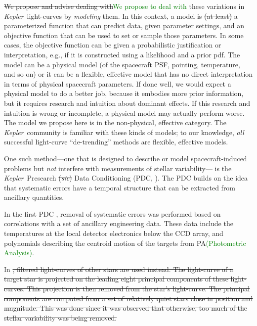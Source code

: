 \documentclass[12pt, preprint]{aastex}
\newcommand{\notenglish}[1]{\textit{#1}}
\newcommand{\sic}{\notenglish{sic}}
\newcommand{\project}[1]{\textsl{#1}}
\newcommand{\Kepler}{\project{Kepler}}
\newcommand{\revise}[1]{\textcolor{green}{#1}}
\newcommand{\remove}[1]{\sout{#1}}
\begin{document}
\remove{We propose and advise dealing with}\revise{We propose to deal with} these variations in \Kepler\ light-curves by \emph{modeling} them.
In this context, a model is \remove{(at least)} a parameterized function that can predict data, given parameter settings,
  and an objective function that can be used to set or sample those parameters.
In some cases, the objective function can be given a probabilistic justification or interpretation, e.g., if it is constructed using a likelihood and a prior pdf.
The model can be a physical model (of the spacecraft PSF, pointing, temperature, and so on)
  or it can be a flexible, effective model that has no direct interpretation in terms of physical spacecraft parameters.
If done well, we would expect a physical model to do a better job,
  because it embodies more prior information,
  but it requires research and intuition about dominant effects. 
If this research and intuition is wrong or incomplete, a physical model may actually perform worse.
The model we propose here is in the non-physical, effective category.
The \Kepler\ community is familiar with these kinds of models;
  to our knowledge, \emph{all} successful light-curve ``de-trending'' methods
  are flexible, effective models.

One such method---one that is designed to describe or model spacecraft-induced problems
  but \emph{not} interfere with measurements of stellar variability---%
  is the \Kepler\ Presearch \remove{(\sic)} Data Conditioning (PDC, \cite{pdc1}).
The PDC builds on the idea that systematic errors have a temporal structure that can be extracted from ancillary quantities. 
%

In the first PDC \citep{pdc1}, 
  removal of systematic errors was performed based on correlations with a set of ancillary engineering data. 
These data include the temperatures at the local detector electronics below the CCD array, 
  and polynomials describing the centroid motion of the targets from PA\revise{(Photometric Analysis)}.

In \cite{pdc2,pdc3}\remove{, filtered light-curves of other stars are used instead. 
The light-curve of a target star is projected on the leading eight principal components of these light-curves. 
This projection is then removed from the star's light-curve. 
The principal components are computed from a set of relatively quiet stars close in position and magnitude. 
This was done since it was observed that otherwise, too much of the stellar variability was being removed.}
\end{document}
